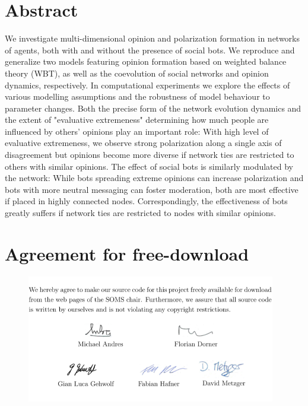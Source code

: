 \documentclass[11pt]{article}
\begin{document}



\newpage


\newpage


\section*{Abstract}
We investigate multi-dimensional opinion and polarization formation in networks of agents, both with and without the presence of social bots. We reproduce and generalize two models featuring opinion formation based on weighted balance theory (WBT), as well as the coevolution of social networks and opinion dynamics, respectively. In computational experiments we explore the effects of various modelling assumptions and the robustness of model behaviour to parameter changes. Both the precise form of the network evolution dynamics and the extent of "evaluative extremeness" determining how much people are influenced by others' opinions play an important role: With high level of evaluative extremeness, we observe strong polarization along a single axis of disagreement but opinions become more diverse if network ties are restricted to others with similar opinions. The effect of social bots is similarly modulated by the network: While bots spreading extreme opinions can increase polarization and bots with more neutral messaging can foster moderation, both are most effective if placed in highly connected nodes. Correspondingly, the effectiveness of bots greatly suffers if network ties are restricted to nodes with similar opinions. 
\section*{Agreement for free-download}

\begin{figure}[h]
    \centering
    \includegraphics[width = 0.97\textwidth]{images/agreement_for_free_download.png}
    \label{dec_of_orig1}
\end{figure}
\end{document}
